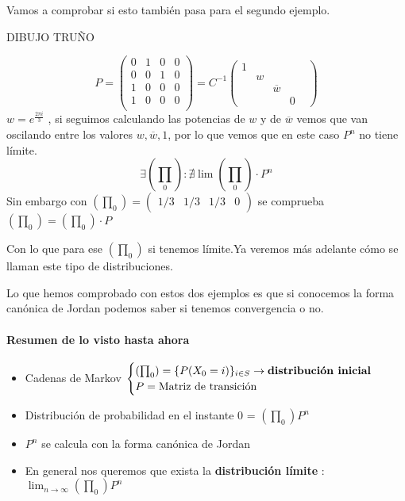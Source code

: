 Vamos a comprobar si esto también pasa para el segundo ejemplo.
\begin{example}[2o caso]
	DIBUJO TRUÑO
	
	$$P = \left( \begin{matrix}
	0 & 1 & 0 & 0\\
	0 & 0 & 1 & 0\\
	1 & 0 & 0 & 0\\
	1 & 0 & 0 & 0\\
	\end{matrix}\right)= C^{-1} \left(\begin{matrix}
	1&&&&\\
	&w&&&\\
	&&\overline{w}&\\
	&&&0
	\end{matrix}
	\right)$$
	$w = e^{\frac{2\pi i}{3}}$ , si seguimos calculando las potencias de $w$ y de $\overline{w}$ vemos que van oscilando entre los valores $w , \overline{w} , 1$, por lo que vemos que en este caso $P^n$ no tiene límite.
	$$\exists(\prod_0) : \nexists \lim (\prod_0)\cdot P^n$$
	Sin embargo con $(\prod_0) = (\begin{matrix}
	1/3&1/3&1/3&0
	\end{matrix}) $ se comprueba $(\prod_0) = (\prod_0)\cdot P$
	
	
	Con lo que para ese $(\prod_0)$ si tenemos límite.Ya veremos más adelante cómo se llaman este tipo de distribuciones.
\end{example}

Lo que hemos comprobado con estos dos ejemplos es que si conocemos la forma canónica de Jordan podemos saber si tenemos convergencia o no.

\paragraph{Resumen de lo visto hasta ahora}
\begin{itemize}
	\item Cadenas de Markov $\begin{cases}
	(\prod_0) = \{P(X_0 = i)\}_{i \in S} \rightarrow \text{\textbf{distribución inicial}}\\
	P = \text{Matriz de transición}
	\end{cases}$
	\item Distribución de probabilidad en el instante 0 = $(\prod_0)P^n$
	\item $P^n$ se calcula con la forma canónica de Jordan
	\item En general nos queremos que exista la \textbf{distribución límite} : $\lim_{n\rightarrow\infty} (\prod_0) P^n$
\end{itemize}

